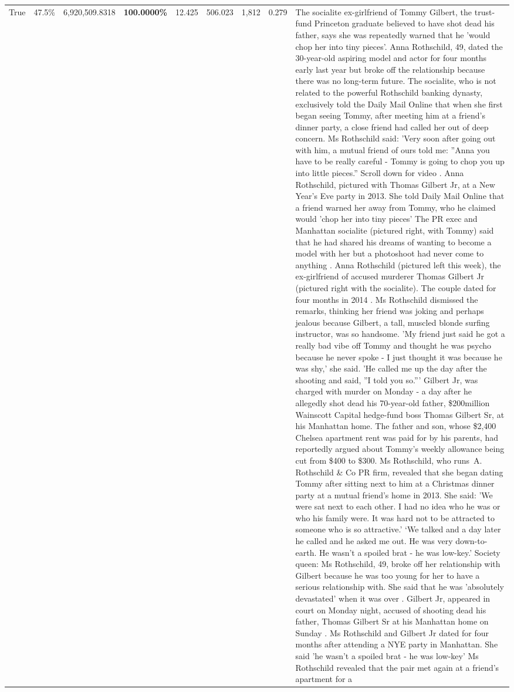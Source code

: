 \begin{table}[H]
\begin{tabular}{lllrlllll}
True & 47.5\% & 6,920,509.8318 & \bfseries \color{red} 100.0000\% & 12.425 & 506.023 & 1,812 & 0.279 & The socialite ex-girlfriend of Tommy Gilbert, the trust-fund Princeton graduate believed to have shot dead his father, says she was repeatedly warned that he 'would chop her into tiny pieces'. Anna Rothschild, 49, dated the 30-year-old aspiring model and actor for four months early last year but broke off the relationship because there was no long-term future. The socialite, who is not related to the powerful Rothschild banking dynasty, exclusively told the Daily Mail Online that when she first began seeing Tommy, after meeting him at a friend's dinner party, a close friend had called her out of deep concern. Ms Rothschild said: 'Very soon after going out with him, a mutual friend of ours told me: ''Anna you have to be really careful - Tommy is going to chop you up into little pieces.'' Scroll down for video . Anna Rothschild, pictured with Thomas Gilbert Jr, at a New Year's Eve party in 2013. She told Daily Mail Online that a friend warned her away from Tommy, who he claimed would 'chop her into tiny pieces' The PR exec and Manhattan socialite (pictured right, with Tommy) said that he had shared his dreams of wanting to become a model with her but a photoshoot had never come to anything . Anna Rothschild (pictured left this week), the ex-girlfriend of accused murderer Thomas Gilbert Jr (pictured right with the socialite). The couple dated for four months in 2014 . Ms Rothschild dismissed the remarks, thinking her friend was joking and perhaps jealous because Gilbert, a tall, muscled blonde surfing instructor, was so handsome. 'My friend just said he got a really bad vibe off Tommy and thought he was psycho because he never spoke - I just thought it was because he was shy,' she said. 'He called me up the day after the shooting and said, ''I told you so.''' Gilbert Jr, was charged with murder on Monday - a day after he allegedly shot dead his 70-year-old father, \$200million Wainscott Capital hedge-fund boss Thomas Gilbert Sr, at his Manhattan home. The father and son, whose \$2,400 Chelsea apartment rent was paid for by his parents, had reportedly argued about Tommy's weekly allowance being cut from \$400 to \$300. Ms Rothschild, who runs A. Rothschild \& Co PR firm, revealed that she began dating Tommy after sitting next to him at a Christmas dinner party at a mutual friend's home in 2013. She said: 'We were sat next to each other. I had no idea who he was or who his family were. It was hard not to be attracted to someone who is so attractive.' ‘We talked and a day later he called and he asked me out. He was very down-to-earth. He wasn’t a spoiled brat - he was low-key.’ Society queen: Ms Rothschild, 49, broke off her relationship with Gilbert because he was too young for her to have a serious relationship with. She said that he was 'absolutely devastated' when it was over . Gilbert Jr, appeared in court on Monday night, accused of shooting dead his father, Thomas Gilbert Sr at his Manhattan home on Sunday . Ms Rothschild and Gilbert Jr dated for four months after attending a NYE party in Manhattan. She said 'he wasn't a spoiled brat - he was low-key' Ms Rothschild revealed that the pair met again at a friend’s apartment for a 
\end{tabular}
\end{table}
